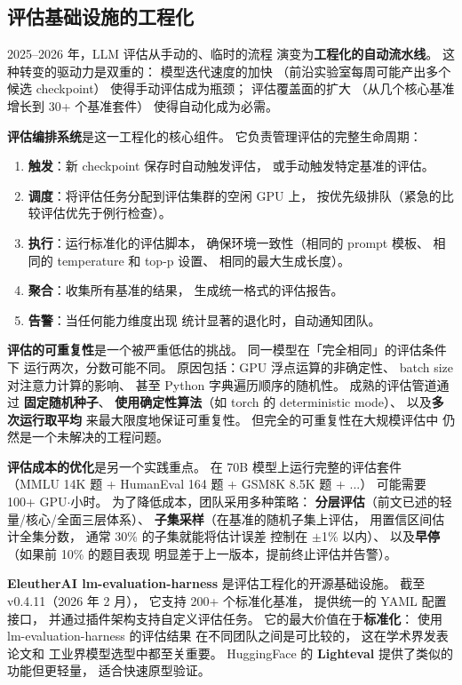 \subsection{评估基础设施的工程化}

2025--2026 年，LLM 评估从手动的、临时的流程
演变为\textbf{工程化的自动流水线}。
这种转变的驱动力是双重的：
模型迭代速度的加快
（前沿实验室每周可能产出多个候选 checkpoint）
使得手动评估成为瓶颈；
评估覆盖面的扩大
（从几个核心基准增长到 30+ 个基准套件）
使得自动化成为必需。

\textbf{评估编排系统}是这一工程化的核心组件。
它负责管理评估的完整生命周期：
\begin{enumerate}[noitemsep]
  \item \textbf{触发}：新 checkpoint 保存时自动触发评估，
        或手动触发特定基准的评估。
  \item \textbf{调度}：将评估任务分配到评估集群的空闲 GPU 上，
        按优先级排队（紧急的比较评估优先于例行检查）。
  \item \textbf{执行}：运行标准化的评估脚本，
        确保环境一致性（相同的 prompt 模板、
        相同的 temperature 和 top-p 设置、
        相同的最大生成长度）。
  \item \textbf{聚合}：收集所有基准的结果，
        生成统一格式的评估报告。
  \item \textbf{告警}：当任何能力维度出现
        统计显著的退化时，自动通知团队。
\end{enumerate}

\textbf{评估的可重复性}是一个被严重低估的挑战。
同一模型在「完全相同」的评估条件下
运行两次，分数可能不同。
原因包括：GPU 浮点运算的非确定性、
batch size 对注意力计算的影响、
甚至 Python 字典遍历顺序的随机性。
成熟的评估管道通过
\textbf{固定随机种子}、
\textbf{使用确定性算法}（如 torch 的 deterministic mode）、
以及\textbf{多次运行取平均}
来最大限度地保证可重复性。
但完全的可重复性在大规模评估中
仍然是一个未解决的工程问题。

\textbf{评估成本的优化}是另一个实践重点。
在 70B 模型上运行完整的评估套件
（MMLU 14K 题 + HumanEval 164 题 + GSM8K 8.5K 题 + ...）
可能需要 100+ GPU$\cdot$小时。
为了降低成本，团队采用多种策略：
\textbf{分层评估}（前文已述的轻量/核心/全面三层体系）、
\textbf{子集采样}（在基准的随机子集上评估，
用置信区间估计全集分数，
通常 30\% 的子集就能将估计误差
控制在 $\pm$1\% 以内）、
以及\textbf{早停}（如果前 10\% 的题目表现
明显差于上一版本，提前终止评估并告警）。

\textbf{EleutherAI lm-evaluation-harness}
是评估工程化的开源基础设施。
截至 v0.4.11（2026 年 2 月），
它支持 200+ 个标准化基准，
提供统一的 YAML 配置接口，
并通过插件架构支持自定义评估任务。
它的最大价值在于\textbf{标准化}：
使用 lm-evaluation-harness 的评估结果
在不同团队之间是可比较的，
这在学术界发表论文和
工业界模型选型中都至关重要。
HuggingFace 的 \textbf{Lighteval}
提供了类似的功能但更轻量，
适合快速原型验证。

